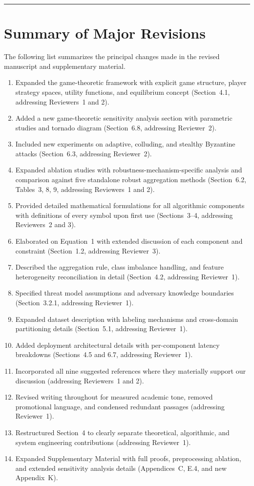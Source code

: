 \documentclass[12pt,a4paper]{article}
\begin{document}
\vspace{1.5em}
\hrule
\vspace{1em}

\section*{Summary of Major Revisions}

The following list summarizes the principal changes made in the revised manuscript and supplementary material.

\begin{enumerate}
\item Expanded the game-theoretic framework with explicit game structure, player strategy spaces, utility functions, and equilibrium concept (Section~4.1, addressing Reviewers~1 and 2).
\item Added a new game-theoretic sensitivity analysis section with parametric studies and tornado diagram (Section~6.8, addressing Reviewer~2).
\item Included new experiments on adaptive, colluding, and stealthy Byzantine attacks (Section~6.3, addressing Reviewer~2).
\item Expanded ablation studies with robustness-mechanism-specific analysis and comparison against five standalone robust aggregation methods (Section~6.2, Tables~3, 8, 9, addressing Reviewers~1 and 2).
\item Provided detailed mathematical formulations for all algorithmic components with definitions of every symbol upon first use (Sections~3--4, addressing Reviewers~2 and 3).
\item Elaborated on Equation~1 with extended discussion of each component and constraint (Section~1.2, addressing Reviewer~3).
\item Described the aggregation rule, class imbalance handling, and feature heterogeneity reconciliation in detail (Section~4.2, addressing Reviewer~1).
\item Specified threat model assumptions and adversary knowledge boundaries (Section~3.2.1, addressing Reviewer~1).
\item Expanded dataset description with labeling mechanisms and cross-domain partitioning details (Section~5.1, addressing Reviewer~1).
\item Added deployment architectural details with per-component latency breakdowns (Sections~4.5 and 6.7, addressing Reviewer~1).
\item Incorporated all nine suggested references where they materially support our discussion (addressing Reviewers~1 and 2).
\item Revised writing throughout for measured academic tone, removed promotional language, and condensed redundant passages (addressing Reviewer~1).
\item Restructured Section~4 to clearly separate theoretical, algorithmic, and system engineering contributions (addressing Reviewer~1).
\item Expanded Supplementary Material with full proofs, preprocessing ablation, and extended sensitivity analysis details (Appendices~C, E.4, and new Appendix~K).
\end{enumerate}
\end{document}
